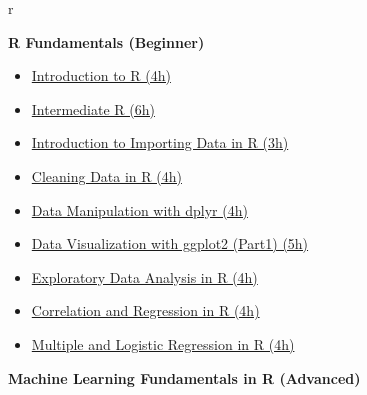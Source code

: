 \documentclass[
  11pt,
]{book}
\providecommand{\tightlist}{%
  \setlength{\itemsep}{0pt}\setlength{\parskip}{0pt}}
\begin{document}
\begin{tips}r

\textbf{R Fundamentals (Beginner)}

\begin{itemize}
\tightlist
\item
  \href{https://www.datacamp.com/courses/free-introduction-to-r}{Introduction
  to R (4h)}
\item
  \href{https://www.datacamp.com/courses/intermediate-r}{Intermediate R
  (6h)}
\item
  \href{https://www.datacamp.com/courses/importing-data-in-r-part-1}{Introduction
  to Importing Data in R (3h)}
\item
  \href{https://www.datacamp.com/courses/cleaning-data-in-r}{Cleaning
  Data in R (4h)}
\item
  \href{https://www.datacamp.com/courses/data-manipulation-with-dplyr-in-r}{Data
  Manipulation with dplyr (4h)}
\item
  \href{https://www.datacamp.com/courses/data-visualization-with-ggplot2-1}{Data
  Visualization with ggplot2 (Part1) (5h)}
\item
  \href{https://www.datacamp.com/courses/exploratory-data-analysis}{Exploratory
  Data Analysis in R (4h)}
\item
  \href{https://www.datacamp.com/courses/correlation-and-regression}{Correlation
  and Regression in R (4h)}
\item
  \href{https://www.datacamp.com/courses/multiple-and-logistic-regression}{Multiple
  and Logistic Regression in R (4h)}
\end{itemize}

\textbf{Machine Learning Fundamentals in R (Advanced)}


\end{tips}
\end{document}
